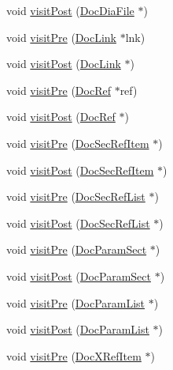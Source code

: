 \begin{DoxyCompactItemize}
\item 
void \hyperlink{class_man_doc_visitor_a4d3b4856af1e7ffbd185ad7807dbbba8}{visit\+Post} (\hyperlink{class_doc_dia_file}{Doc\+Dia\+File} $\ast$)
\item 
void \hyperlink{class_man_doc_visitor_a7ba393580fadc6fa0a1f1a272f966aee}{visit\+Pre} (\hyperlink{class_doc_link}{Doc\+Link} $\ast$lnk)
\item 
void \hyperlink{class_man_doc_visitor_a2fe6cb8b77d2ffa49b3ed2c9f6c42316}{visit\+Post} (\hyperlink{class_doc_link}{Doc\+Link} $\ast$)
\item 
void \hyperlink{class_man_doc_visitor_ad80337d915a216e7ae4aae63fd24a25d}{visit\+Pre} (\hyperlink{class_doc_ref}{Doc\+Ref} $\ast$ref)
\item 
void \hyperlink{class_man_doc_visitor_a7d31e38e1fec57232289cb4518ba8054}{visit\+Post} (\hyperlink{class_doc_ref}{Doc\+Ref} $\ast$)
\item 
void \hyperlink{class_man_doc_visitor_a0926730129e69e040d75a6dcac362890}{visit\+Pre} (\hyperlink{class_doc_sec_ref_item}{Doc\+Sec\+Ref\+Item} $\ast$)
\item 
void \hyperlink{class_man_doc_visitor_ad1c2b3e8af0ec9920e69ba839536a1c9}{visit\+Post} (\hyperlink{class_doc_sec_ref_item}{Doc\+Sec\+Ref\+Item} $\ast$)
\item 
void \hyperlink{class_man_doc_visitor_a9d1f53ca1901201c4cacdeff2f00a5a5}{visit\+Pre} (\hyperlink{class_doc_sec_ref_list}{Doc\+Sec\+Ref\+List} $\ast$)
\item 
void \hyperlink{class_man_doc_visitor_accf0aae5841a6773156ea6e375d1c1f7}{visit\+Post} (\hyperlink{class_doc_sec_ref_list}{Doc\+Sec\+Ref\+List} $\ast$)
\item 
void \hyperlink{class_man_doc_visitor_a540d76af886f61c3384596371bec3d30}{visit\+Pre} (\hyperlink{class_doc_param_sect}{Doc\+Param\+Sect} $\ast$)
\item 
void \hyperlink{class_man_doc_visitor_a4a6c2a565b9ed4fa569dc0fa80f6b4e1}{visit\+Post} (\hyperlink{class_doc_param_sect}{Doc\+Param\+Sect} $\ast$)
\item 
void \hyperlink{class_man_doc_visitor_ae5378c1f14ea3d19a82a98ebde7ce15e}{visit\+Pre} (\hyperlink{class_doc_param_list}{Doc\+Param\+List} $\ast$)
\item 
void \hyperlink{class_man_doc_visitor_abcb6114aa293563412d7fda27cc792f3}{visit\+Post} (\hyperlink{class_doc_param_list}{Doc\+Param\+List} $\ast$)
\item 
void \hyperlink{class_man_doc_visitor_a8c6d2c77be7831b8be778fc8f309d69a}{visit\+Pre} (\hyperlink{class_doc_x_ref_item}{Doc\+X\+Ref\+Item} $\ast$)

\end{DoxyCompactItemize}

